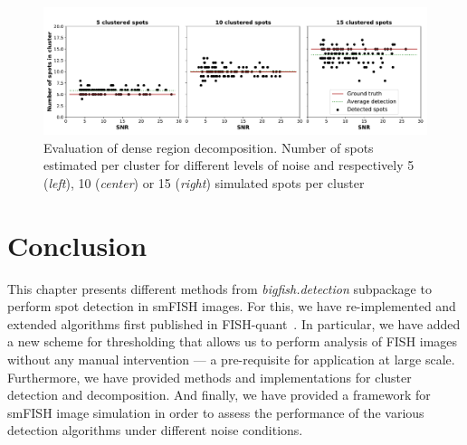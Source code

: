 
\begin{figure}[]
    \centering
    \includegraphics[width=1\textwidth]{figures/chapter2/cluster_along_noise}
    \caption[Evaluation of dense region decomposition]{Evaluation of dense region decomposition.
	 Number of spots estimated per cluster for different levels of noise and respectively 5 (\textit{left}), 10 (\textit{center}) or 15 (\textit{right}) simulated spots per cluster}
    \label{fig:cluster_results}
\end{figure}

\section{Conclusion}
\label{sec:detection_conclusion}

This chapter presents different methods from \emph{bigfish.detection} subpackage to perform spot detection in \ac{smFISH} images.
For this, we have re-implemented and extended algorithms first published in FISH-quant~\cite{mueller_fish-quant_2013}.
In particular, we have added a new scheme for thresholding that allows us to perform analysis of \ac{FISH} images without any manual intervention --- a pre-requisite for application at large scale.
Furthermore, we have provided methods and implementations for cluster detection and decomposition.
And finally, we have provided a framework for \ac{smFISH} image simulation in order to assess the performance of the various detection algorithms under different noise conditions.

